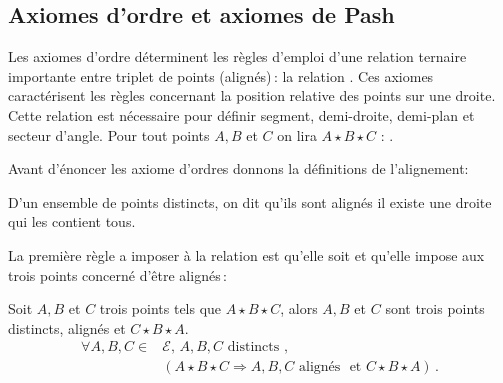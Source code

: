         \subsection{Axiomes d'ordre et axiomes de Pash}\setcounter{serieaxiom}{2}\setcounter{axi}{0}

Les axiomes d'ordre déterminent les règles d'emploi d'une relation ternaire importante entre triplet de points (alignés)\,:  la relation . Ces axiomes caractérisent les règles concernant la position relative des points sur une droite. Cette relation  est nécessaire pour définir segment, demi-droite, demi-plan et secteur d'angle. Pour tout points $A,B$ et $C$ on lira $A\star B \star C$ : .

Avant d'énoncer les axiome d'ordres donnons la définitions de l'alignement:
\begin{defi}
    D'un ensemble de points distincts, on dit qu'ils sont alignés \ssi il existe une droite qui les contient tous. 
\end{defi}



La première règle a imposer à la relation  est qu'elle soit  et qu'elle impose aux trois points concerné d'être alignés\,: 



\begin{axi}\label{ax-B1}
    Soit $A,B$ et $C$ trois points tels que $A\star B \star C$, alors $A,B$ et $C$ sont trois points distincts, alignés et $C\star B \star A$.
    \begin{align*}
        \forall A,B,C\in&\mathcal{E},\, A,B,C \text{ distincts },  \\
        &\left(A\star B \star C\Rightarrow A,B,C \text{ alignés } \text{ et } C\star B \star A \right)\,.
    \end{align*}
\end{axi}



